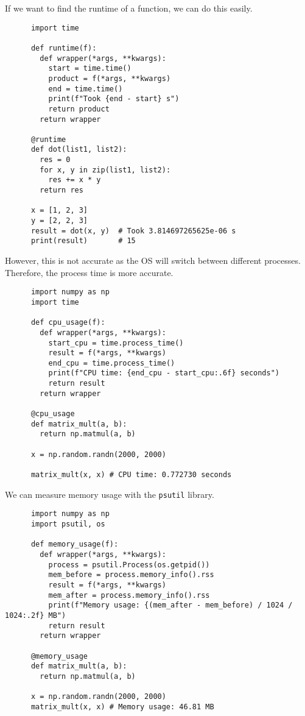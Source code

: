 \documentclass{article}
\begin{document}
  \begin{example}
    If we want to find the runtime of a function, we can do this easily. 

    \begin{lstlisting}
      import time 

      def runtime(f): 
        def wrapper(*args, **kwargs): 
          start = time.time() 
          product = f(*args, **kwargs) 
          end = time.time() 
          print(f"Took {end - start} s") 
          return product
        return wrapper

      @runtime
      def dot(list1, list2): 
        res = 0 
        for x, y in zip(list1, list2): 
          res += x * y 
        return res

      x = [1, 2, 3]
      y = [2, 2, 3]
      result = dot(x, y)  # Took 3.814697265625e-06 s 
      print(result)       # 15 
    \end{lstlisting}

    However, this is not accurate as the OS will switch between different processes. Therefore, the process time is more accurate. 

    \begin{lstlisting}
      import numpy as np
      import time

      def cpu_usage(f):
        def wrapper(*args, **kwargs):
          start_cpu = time.process_time()
          result = f(*args, **kwargs)
          end_cpu = time.process_time()
          print(f"CPU time: {end_cpu - start_cpu:.6f} seconds")
          return result
        return wrapper

      @cpu_usage
      def matrix_mult(a, b): 
        return np.matmul(a, b)

      x = np.random.randn(2000, 2000)

      matrix_mult(x, x) # CPU time: 0.772730 seconds
    \end{lstlisting}
  \end{example}

  \begin{example}
    We can measure memory usage with the \texttt{psutil} library. 
    \begin{lstlisting}
      import numpy as np
      import psutil, os 

      def memory_usage(f):
        def wrapper(*args, **kwargs):
          process = psutil.Process(os.getpid())
          mem_before = process.memory_info().rss
          result = f(*args, **kwargs)
          mem_after = process.memory_info().rss
          print(f"Memory usage: {(mem_after - mem_before) / 1024 / 1024:.2f} MB")
          return result
        return wrapper

      @memory_usage 
      def matrix_mult(a, b): 
        return np.matmul(a, b)

      x = np.random.randn(2000, 2000)
      matrix_mult(x, x) # Memory usage: 46.81 MB
    \end{lstlisting}
  \end{example}
\end{document}
